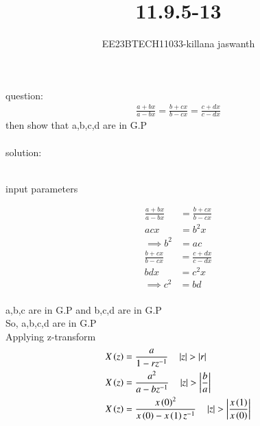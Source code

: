 \documentclass[journal,12pt,twocolumn]{IEEEtran}
\theoremstyle{remark}
\begin{document}

\vspace{3cm}

\title{11.9.5-13}
\author{EE23BTECH11033-killana jaswanth}
\maketitle
\newpage

\bigskip

\renewcommand{\thefigure}{\theenumi}
\renewcommand{\thetable}{\theenumi}
question:\begin{align}
\frac{a+bx}{a-bx}=\frac{b+cx}{b-cx}=\frac{c+dx}{c-dx}
\end{align}
then show that a,b,c,d are in G.P\\\\
solution:\\
\\\begin{table}[!ht]
 \centering
  
   \caption{input parameters}
   \label{tab:11.9.5.13}
   \end{table}
\begin{align}
\frac{a+bx}{a-bx}&=\frac{b+cx}{b-cx}\\
acx&=b^2x\\
\implies b^2&=ac
\end{align}
\begin{align}
\frac{b+cx}{b-cx}&=\frac{c+dx}{c-dx}\\
bdx&=c^2x\\
\implies c^2&=bd
\end{align}\\
a,b,c are in G.P and b,c,d are in G.P\\
So, a,b,c,d are in G.P\\
Applying z-transform\\
\begin{align}
X\left(z\right)&=\frac{a}{1-rz^{-1}} \quad \left\vert z\right\vert>\left\vert r\right\vert\\
X\left(z\right)&=\frac{a^2}{a-bz^{-1}}\quad \left\vert z\right\vert>\left\vert\frac{b}{a}\right\vert\\
X\left(z\right)&=\frac{x\left(0\right)^2}{x\left(0\right)-x\left(1\right)z^{-1}}\quad \left\vert z\right\vert>\left\vert\frac{x\left(1\right)}{x\left(0\right)}\right\vert
\end{align}
\end{document}
